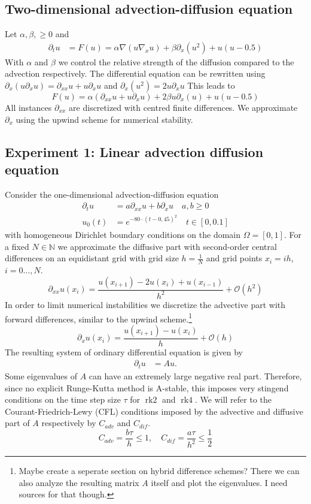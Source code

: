 \documentclass{scrartcl}
\begin{document}
	\subsection{Two-dimensional advection-diffusion equation}
	Let $\alpha,\beta,\ge 0$ and 
	\begin{align*}
	\partial_tu &= F(u) = \alpha\nabla(u\nabla_xu) + \beta\partial_x(u^2) + u(u-0.5)
	\end{align*}
	With $\alpha$ and $\beta$ we control the relative strength of the diffusion compared to the advection respectively. The differential equation can be rewritten using $\partial_x(u\partial_xu) = \partial_{xx}u + u\partial_{x}u$ and $\partial_x(u^2) = 2u\partial_{x}u$
	This leads to
	\[
	F(u) = 
	\alpha(\partial_{xx}u + u\partial_{x}u) 
	+ 2\beta u\partial_x(u) 
	+ u(u-0.5)
	\]
	All instances $\partial_{xx}$ are discretized with centred finite differences. We approximate $\partial_{x}$ using the upwind scheme for numerical stability.
	
	\subsection{Experiment 1: Linear advection diffusion equation}
	Consider the one-dimensional advection-diffusion equation
	\begin{align*}
	\partial_tu &= a\partial_{xx}u + b\partial_xu \quad a,b\ge 0\\
	u_0(t) &= e^{-80\cdot(t-0,45)^2} \quad t\in[0,0.1]
	\end{align*}
	with homogeneous Dirichlet boundary conditions on the domain $\Omega = [0,1]$. 
	For a fixed $N\in\mathbb N$ we approximate the diffusive part with second-order central differences on an equidistant grid with grid size $h = \frac{1}{N}$ and grid points $x_i = ih$, $i=0\dots,N$.
	\[\partial_{xx}u(x_i) = \frac{u(x_{i+1}) - 2u(x_i) + u(x_{i-1})}{{h}^2} + \mathcal{O}({h}^2)\]
	In order to limit numerical instabilities we discretize the advective part with forward differences, similar to the upwind scheme.\footnote{Maybe create a seperate section on hybrid difference schemes? There we can also analyze the resulting matrix $A$ itself and plot the eigenvalues. I need sources for that though.}
	\[\partial_{x}u(x_i) = \frac{u(x_{i+1}) - u(x_i)}{h} + \mathcal{O}(h)\]
	The resulting system of ordinary differential equation is given by
	\begin{align*}
	\partial_tu &= Au.
	\end{align*} 
	Some eigenvalues of $A$ can have an extremely large negative real part. Therefore, since no explicit Runge-Kutta method is A-stable, this imposes very stingend conditions on the time step size $\tau$ for $\operatorname{rk2}$ and $\operatorname{rk4}$. We will refer to the Courant-Friedrich-Lewy (CFL) conditions imposed by the advective and diffusive part of $A$ respectively by $C_{adv}$ and $C_{dif}$.  
	\[ C_{adv} = \frac{b\tau}{h} \le 1, \quad C_{dif} = \frac{a\tau}{h^2} \le \frac{1}{2}\] 
	
\end{document}
